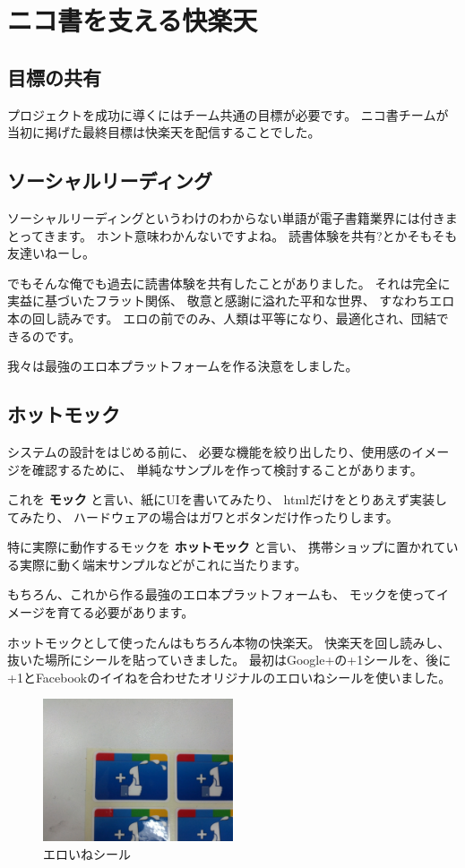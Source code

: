 \section{ニコ書を支える快楽天}

\subsection{目標の共有}

プロジェクトを成功に導くにはチーム共通の目標が必要です。
ニコ書チームが当初に掲げた最終目標は快楽天を配信することでした。

\subsection{ソーシャルリーディング}

ソーシャルリーディングというわけのわからない単語が電子書籍業界には付きまとってきます。
ホント意味わかんないですよね。 読書体験を共有?とかそもそも友達いねーし。

でもそんな俺でも過去に読書体験を共有したことがありました。
それは完全に実益に基づいたフラット関係、 敬意と感謝に溢れた平和な世界、
すなわちエロ本の回し読みです。
エロの前でのみ、人類は平等になり、最適化され、団結できるのです。

我々は最強のエロ本プラットフォームを作る決意をしました。

\subsection{ホットモック}

システムの設計をはじめる前に、
必要な機能を絞り出したり、使用感のイメージを確認するために、
単純なサンプルを作って検討することがあります。

これを \textbf{モック} と言い、紙にUIを書いてみたり、
htmlだけをとりあえず実装してみたり、
ハードウェアの場合はガワとボタンだけ作ったりします。

特に実際に動作するモックを \textbf{ホットモック} と言い、
携帯ショップに置かれている実際に動く端末サンプルなどがこれに当たります。

もちろん、これから作る最強のエロ本プラットフォームも、
モックを使ってイメージを育てる必要があります。

ホットモックとして使ったんはもちろん本物の快楽天。
快楽天を回し読みし、抜いた場所にシールを貼っていきました。
最初はGoogle+の+1シールを、後に+1とFacebookのイイねを合わせたオリジナルのエロいねシールを使いました。

\begin{figure}[H]
  \centering
  \includegraphics[width=0.5\textwidth]{../images/eroine.jpg}
  \caption{エロいねシール}
\end{figure}

